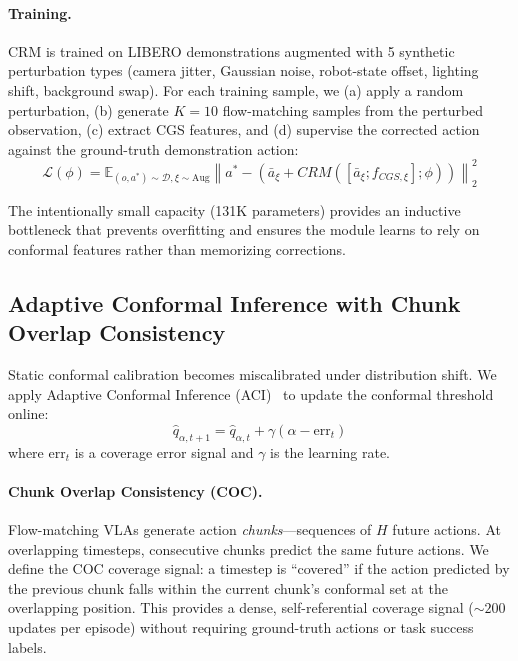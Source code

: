 \documentclass[10pt,letterpaper]{article}
\newcommand{\crm}{CRM}
\newcommand{\cgs}{CGS}
\newcommand{\aci}{ACI}
\begin{document}
\paragraph{Training.}
\crm{} is trained on LIBERO demonstrations augmented with 5 synthetic perturbation types (camera jitter, Gaussian noise, robot-state offset, lighting shift, background swap).
For each training sample, we (a) apply a random perturbation, (b) generate $K{=}10$ flow-matching samples from the perturbed observation, (c) extract \cgs{} features, and (d) supervise the corrected action against the ground-truth demonstration action:
\begin{equation}
    \mathcal{L}(\phi) = \mathbb{E}_{(o,a^*) \sim \mathcal{D}, \xi \sim \text{Aug}} \left\| a^* - \left(\bar{a}_\xi + \crm{}([\bar{a}_\xi; f_{\cgs{},\xi}]; \phi)\right) \right\|_2^2
\end{equation}

The intentionally small capacity (131K parameters) provides an inductive bottleneck that prevents overfitting and ensures the module learns to rely on conformal features rather than memorizing corrections.

\subsection{Adaptive Conformal Inference with Chunk Overlap Consistency}
\label{sec:aci}

Static conformal calibration becomes miscalibrated under distribution shift.
We apply Adaptive Conformal Inference (\aci{})~\cite{gibbs2021aci} to update the conformal threshold online:
\begin{equation}
    \hat{q}_{\alpha,t+1} = \hat{q}_{\alpha,t} + \gamma(\alpha - \text{err}_t)
\end{equation}
where $\text{err}_t$ is a coverage error signal and $\gamma$ is the learning rate.

\paragraph{Chunk Overlap Consistency (COC).}
Flow-matching VLAs generate action \emph{chunks}---sequences of $H$ future actions.
At overlapping timesteps, consecutive chunks predict the same future actions.
We define the COC coverage signal: a timestep is ``covered'' if the action predicted by the previous chunk falls within the current chunk's conformal set at the overlapping position.
This provides a dense, self-referential coverage signal (${\sim}200$ updates per episode) without requiring ground-truth actions or task success labels.
\end{document}
